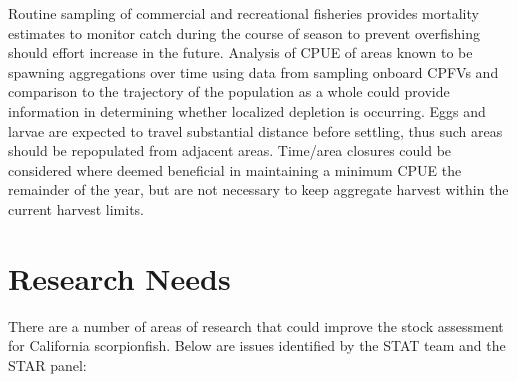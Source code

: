 \documentclass[12pt,]{article}
\begin{document}
Routine sampling of commercial and recreational fisheries provides
mortality estimates to monitor catch during the course of season to
prevent overfishing should effort increase in the future. Analysis of
CPUE of areas known to be spawning aggregations over time using data
from sampling onboard CPFVs and comparison to the trajectory of the
population as a whole could provide information in determining whether
localized depletion is occurring. Eggs and larvae are expected to travel
substantial distance before settling, thus such areas should be
repopulated from adjacent areas. Time/area closures could be considered
where deemed beneficial in maintaining a minimum CPUE the remainder of
the year, but are not necessary to keep aggregate harvest within the
current harvest limits.

\section{Research Needs}\label{research-needs}

There are a number of areas of research that could improve the stock
assessment for California scorpionfish. Below are issues identified by
the STAT team and the STAR panel:
\end{document}
